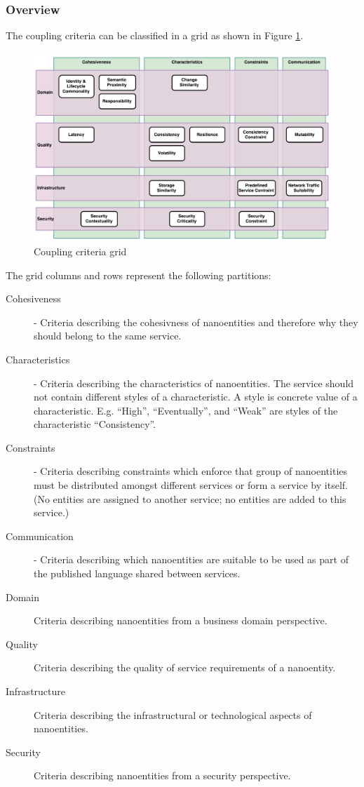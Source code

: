 \subsubsection{Overview}

The coupling criteria can be classified in a grid as shown in Figure \ref{fig:cc_grid}.

\begin{figure}[H]
	\includegraphics[scale=0.5]{diagrams/CouplingCatalog.pdf}
	\caption{Coupling criteria grid}
	\label{fig:cc_grid}
\end{figure}

The grid columns and rows represent the following partitions:

\begin{description}
	\item[Cohesiveness] - Criteria describing the cohesivness of nanoentities and  therefore why they should belong to the same service. 
	\item[Characteristics] - Criteria describing the characteristics of nanoentities. The service should not contain different styles of a characteristic. A style is concrete value of a characteristic. E.g. \enquote{High}, \enquote{Eventually}, and \enquote{Weak} are styles of the characteristic \enquote{Consistency}.
	\item[Constraints] - Criteria describing constraints which enforce that group of nanoentities must be distributed amongst different services or form a service by itself. (No entities are assigned to another service; no entities are added to this service.)
	\item[Communication] - Criteria describing which nanoentities are suitable to be used as part of the published language shared between services. 
	\item[Domain] Criteria describing nanoentities from a business domain perspective.
	\item[Quality] Criteria describing the quality of service requirements of a nanoentity.  
	\item[Infrastructure] Criteria describing the infrastructural or technological aspects of nanoentities.
	\item[Security] Criteria describing nanoentities from a security perspective.

\end{description}

